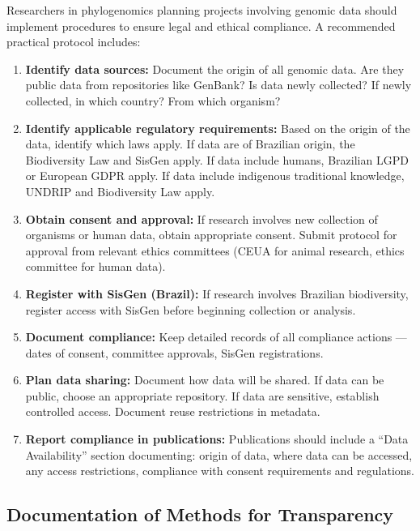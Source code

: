 Researchers in phylogenomics planning projects involving genomic data should implement procedures to ensure legal and ethical compliance. A recommended practical protocol includes:

\begin{enumerate}
    \item \textbf{Identify data sources:} Document the origin of all genomic data. Are they public data from repositories like GenBank? Is data newly collected? If newly collected, in which country? From which organism?

    \item \textbf{Identify applicable regulatory requirements:} Based on the origin of the data, identify which laws apply. If data are of Brazilian origin, the Biodiversity Law and SisGen apply. If data include humans, Brazilian LGPD or European GDPR apply. If data include indigenous traditional knowledge, UNDRIP and Biodiversity Law apply.

    \item \textbf{Obtain consent and approval:} If research involves new collection of organisms or human data, obtain appropriate consent. Submit protocol for approval from relevant ethics committees (CEUA for animal research, ethics committee for human data).

    \item \textbf{Register with SisGen (Brazil):} If research involves Brazilian biodiversity, register access with SisGen before beginning collection or analysis.

    \item \textbf{Document compliance:} Keep detailed records of all compliance actions --- dates of consent, committee approvals, SisGen registrations.

    \item \textbf{Plan data sharing:} Document how data will be shared. If data can be public, choose an appropriate repository. If data are sensitive, establish controlled access. Document reuse restrictions in metadata.

    \item \textbf{Report compliance in publications:} Publications should include a ``Data Availability'' section documenting: origin of data, where data can be accessed, any access restrictions, compliance with consent requirements and regulations.
\end{enumerate}

\subsection{Documentation of Methods for Transparency}

